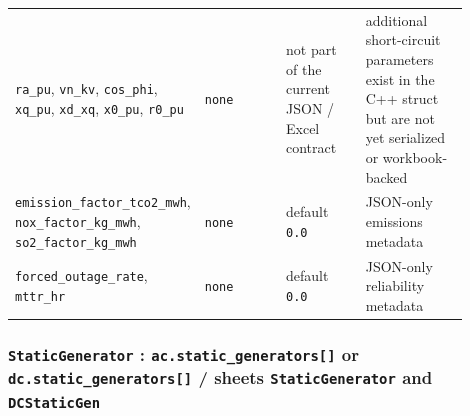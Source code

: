 \begin{longtable}{L{0.20\linewidth}L{0.24\linewidth}L{0.20\linewidth}L{0.26\linewidth}}
\texttt{ra\_pu}, \texttt{vn\_kv}, \texttt{cos\_phi}, \texttt{xq\_pu}, \texttt{xd\_xq}, \texttt{x0\_pu}, \texttt{r0\_pu} & \texttt{none} & not part of the current JSON / Excel contract & additional short-circuit parameters exist in the C++ struct but are not yet serialized or workbook-backed \\
\texttt{emission\_factor\_tco2\_mwh}, \texttt{nox\_factor\_kg\_mwh}, \texttt{so2\_factor\_kg\_mwh} & \texttt{none} & default \texttt{0.0} & JSON-only emissions metadata \\
\texttt{forced\_outage\_rate}, \texttt{mttr\_hr} & \texttt{none} & default \texttt{0.0} & JSON-only reliability metadata \\
\bottomrule
\end{longtable}

\subsubsection*{\texttt{StaticGenerator} : \texttt{ac.static\_generators[]} or \texttt{dc.static\_generators[]} / sheets \texttt{StaticGenerator} and \texttt{DCStaticGen}}

